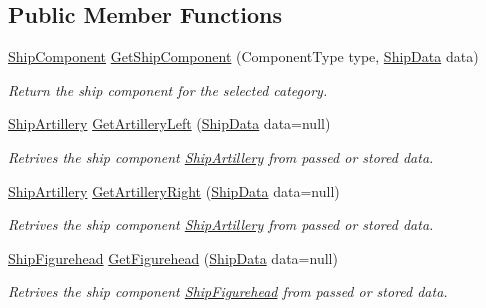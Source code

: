 \subsection*{Public Member Functions}
\begin{DoxyCompactItemize}
\item 
\hyperlink{class_skyrates_1_1_client_1_1_ship_1_1_ship_component}{Ship\-Component} \hyperlink{class_skyrates_1_1_client_1_1_ship_1_1_ship_builder_ab33531b8d3ab8ea2483a10bf0ae7d08a}{Get\-Ship\-Component} (Component\-Type type, \hyperlink{class_ship_data}{Ship\-Data} data)
\begin{DoxyCompactList}\small\item\em Return the ship component for the selected category. \end{DoxyCompactList}\item 
\hyperlink{class_skyrates_1_1_client_1_1_ship_1_1_ship_artillery}{Ship\-Artillery} \hyperlink{class_skyrates_1_1_client_1_1_ship_1_1_ship_builder_a7c593db37500ee33faf154ac56efdd6d}{Get\-Artillery\-Left} (\hyperlink{class_ship_data}{Ship\-Data} data=null)
\begin{DoxyCompactList}\small\item\em Retrives the ship component \hyperlink{class_skyrates_1_1_client_1_1_ship_1_1_ship_artillery}{Ship\-Artillery} from passed or stored data. \end{DoxyCompactList}\item 
\hyperlink{class_skyrates_1_1_client_1_1_ship_1_1_ship_artillery}{Ship\-Artillery} \hyperlink{class_skyrates_1_1_client_1_1_ship_1_1_ship_builder_a2800839fe2bd3a7c923bcbc1b94ada95}{Get\-Artillery\-Right} (\hyperlink{class_ship_data}{Ship\-Data} data=null)
\begin{DoxyCompactList}\small\item\em Retrives the ship component \hyperlink{class_skyrates_1_1_client_1_1_ship_1_1_ship_artillery}{Ship\-Artillery} from passed or stored data. \end{DoxyCompactList}\item 
\hyperlink{class_skyrates_1_1_client_1_1_ship_1_1_ship_figurehead}{Ship\-Figurehead} \hyperlink{class_skyrates_1_1_client_1_1_ship_1_1_ship_builder_a90dcdabb433c34752b8eaa1462e93bcb}{Get\-Figurehead} (\hyperlink{class_ship_data}{Ship\-Data} data=null)
\begin{DoxyCompactList}\small\item\em Retrives the ship component \hyperlink{class_skyrates_1_1_client_1_1_ship_1_1_ship_figurehead}{Ship\-Figurehead} from passed or stored data. \end{DoxyCompactList}\item 

\end{DoxyCompactItemize}
